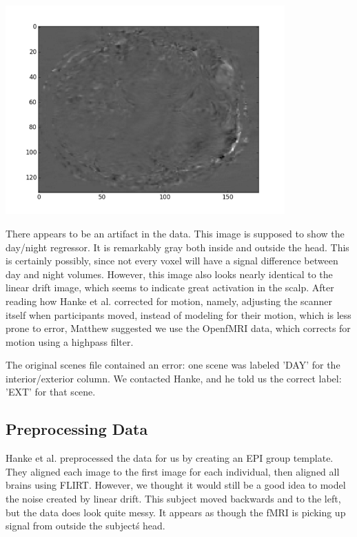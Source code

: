 \documentclass[11pt]{article}
\begin{document}
\begin{center}                                                                  
\includegraphics[height=8cm]{1}                                                 
\end{center}    
There appears to be an artifact in the data.  This image is supposed to show 
the day/night regressor. It is remarkably gray both inside and outside the 
head.  This is certainly possibly, since not every voxel will have a signal
difference between day and night volumes.  However, this image also looks 
nearly identical to the linear drift image, which seems to indicate great
activation in the scalp.  After reading how Hanke et al. corrected for motion,
namely, adjusting the scanner itself when participants moved, instead of 
modeling for their motion, which is less prone to error, Matthew suggested we
use the OpenfMRI data, which corrects for motion using a highpass filter.

The original scenes file contained an error: one scene was labeled 'DAY' for 
the interior/exterior column.  We contacted Hanke, and he told us the correct 
label: 'EXT' for that scene.     
   
\subsection{Preprocessing Data}                      

Hanke et al. preprocessed the data for us by creating an EPI group template.    
They aligned each image to the first image for each individual, then aligned    
all brains using FLIRT.  However, we thought it would still be a good idea to   
model the noise created by linear drift.  This subject moved backwards and to   
the left, but the data does look quite messy.  It appears as though the fMRI    
is picking up signal from outside the subject\'s head.
\end{document}
